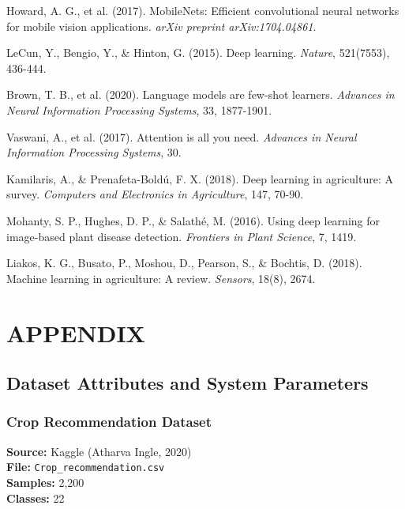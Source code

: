 \documentclass[12pt,a4paper]{report}
\begin{document}
\begin{enumerate}[leftmargin=*,label={[\arabic*]},itemsep=8pt]
\item Howard, A. G., et al. (2017). MobileNets: Efficient convolutional neural networks for mobile vision applications. \textit{arXiv preprint arXiv:1704.04861}.

\item LeCun, Y., Bengio, Y., \& Hinton, G. (2015). Deep learning. \textit{Nature}, 521(7553), 436-444.

\item Brown, T. B., et al. (2020). Language models are few-shot learners. \textit{Advances in Neural Information Processing Systems}, 33, 1877-1901.

\item Vaswani, A., et al. (2017). Attention is all you need. \textit{Advances in Neural Information Processing Systems}, 30.

\item Kamilaris, A., \& Prenafeta-Bold{\'u}, F. X. (2018). Deep learning in agriculture: A survey. \textit{Computers and Electronics in Agriculture}, 147, 70-90.

\item Mohanty, S. P., Hughes, D. P., \& Salath{\'e}, M. (2016). Using deep learning for image-based plant disease detection. \textit{Frontiers in Plant Science}, 7, 1419.

\item Liakos, K. G., Busato, P., Moshou, D., Pearson, S., \& Bochtis, D. (2018). Machine learning in agriculture: A review. \textit{Sensors}, 18(8), 2674.
\end{enumerate}

\appendix
\chapter{APPENDIX}

\section{Dataset Attributes and System Parameters}

\subsection{Crop Recommendation Dataset}
\textbf{Source:} Kaggle (Atharva Ingle, 2020) \\
\textbf{File:} \texttt{Crop\_recommendation.csv} \\
\textbf{Samples:} 2,200 \\
\textbf{Classes:} 22
\end{document}
